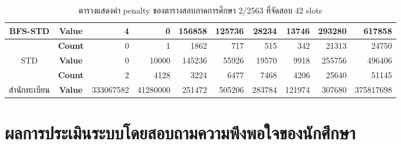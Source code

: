 \begin{table}[]
{\begin{tabular}{@{}ccrrrrrrrr@{}}
    \multirow{-2}{*}{BFS-STD}                    & \textbf{Value}                        & 4                        & 0                        & 156858                        & 125736                       & 28234                        & 13746                        & 293280                        & 617858                        \\ \midrule
                                                 & \textbf{Count}                        & 0                        & 1                        & 1862                          & 717                          & 515                          & 342                          & 21313                         & 24750                         \\ \cmidrule(l){2-10} 
    \multirow{-2}{*}{STD}                        & \textbf{Value}                        & 0                        & 10000                    & 145236                        & 55926                        & 19570                        & 9918                         & 255756                        & 496406                        \\ \midrule
                                                 & \textbf{Count}                        & 2                        & 4128                     & 3224                          & 6477                         & 7468                         & 4206                         & 25640                         & 51145                         \\ \cmidrule(l){2-10} 
    \multirow{-2}{*}{สำนักทะเบียน}               & \textbf{Value}                          & 333067582                 & 41280000                 & 251472                        & 505206                       & 283784                       & 121974                       & 307680                        & 375817698                     \\ \bottomrule
    \end{tabular}%
    }
    \caption{ตารางแสดงค่า penalty ของตารางสอบภาคการศึกษา 2/2563 ที่จัดสอบ 42 slots}
    \label{tab:result_table_263}
\end{table}

\section{ผลการประเมินระบบโดยสอบถามความพึงพอใจของนักศึกษา}
